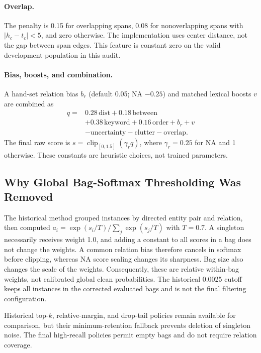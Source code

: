 \documentclass[11pt]{article}
\begin{document}
\paragraph{Overlap.}
The penalty is 0.15 for overlapping spans, 0.08 for nonoverlapping spans with $|h_c-t_c|<5$, and zero otherwise. The implementation uses center distance, not the gap between span edges. This feature is constant zero on the valid development population in this audit.

\paragraph{Bias, boosts, and combination.}
A hand-set relation bias $b_r$ (default 0.05; NA $-0.25$) and matched lexical boosts $v$ are combined as
\[
\begin{aligned}
q={}&0.28\,\mathrm{dist}+0.18\,\mathrm{between}\\
 &+0.38\,\mathrm{keyword}+0.16\,\mathrm{order}+b_r+v\\
 &-\mathrm{uncertainty}-\mathrm{clutter}-\mathrm{overlap}.
\end{aligned}
\]
The final raw score is $s=\operatorname{clip}_{[0,1.5]}(\gamma_r q)$, where $\gamma_r=0.25$ for NA and 1 otherwise. These constants are heuristic choices, not trained parameters.

\subsection{Why Global Bag-Softmax Thresholding Was Removed}
The historical method grouped instances by directed entity pair and relation, then computed $a_i=\exp(s_i/T)/\sum_j\exp(s_j/T)$ with $T=0.7$. A singleton necessarily receives weight 1.0, and adding a constant to all scores in a bag does not change the weights. A common relation bias therefore cancels in softmax before clipping, whereas NA score scaling changes its sharpness. Bag size also changes the scale of the weights. Consequently, these are relative within-bag weights, not calibrated global clean probabilities. The historical 0.0025 cutoff keeps all instances in the corrected evaluated bags and is not the final filtering configuration.

Historical top-$k$, relative-margin, and drop-tail policies remain available for comparison, but their minimum-retention fallback prevents deletion of singleton noise. The final high-recall policies permit empty bags and do not require relation coverage.
\end{document}
